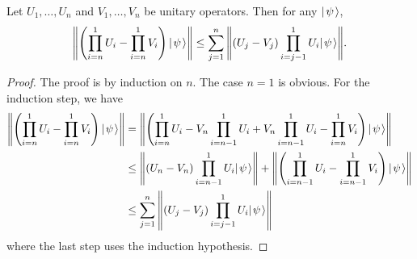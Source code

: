\documentclass[../thesis-main/thesis-main]{subfiles}
\begin{document}
\begin{proposition}
\label{pro:hybrid}Let $U_1,\ldots, U_n$ and $V_1,\ldots, V_n$  be unitary operators.  Then for any $|\mspace{2mu} \psi \mspace{2mu} \rangle$,
\begin{equation}
  \left\|{\left(\prod_{i=n}^1 U_i - \prod_{i=n}^1 V_i \right) |\mspace{2mu} \psi \mspace{2mu} \rangle}\right\|   \le \sum_{j=1}^n \Bigg\|{(U_j - V_j)\prod_{i=j-1}^1 U_i |\mspace{2mu} \psi \mspace{2mu} \rangle}\Bigg\|.
\end{equation}
\end{proposition}

\begin{proof}
The proof is by induction on $n$.  The case $n=1$ is obvious.  For the induction step, we have \begin{align}   \left\|{\left(\prod_{i=n}^1 U_i - \prod_{i=n}^1 V_i \right) |\mspace{2mu} \psi \mspace{2mu} \rangle}\right\|   &= \left\|{\left(\prod_{i=n}^1 U_i - V_n \prod_{i=n-1}^1 U_i             + V_n \prod_{i=n-1}^1 U_i - \prod_{i=n}^1 V_i \right) |\mspace{2mu} \psi \mspace{2mu} \rangle}\right\| \\   &\le \left\|{(U_n - V_n) \prod_{i=n-1}^1 U_i |\mspace{2mu} \psi \mspace{2mu} \rangle}\right\|       +\left\|{\left(\prod_{i=n-1}^1 U_i - \prod_{i=n-1}^1 V_i \right) |\mspace{2mu} \psi \mspace{2mu} \rangle}\right\| \\   &\le \sum_{j=1}^n \left\|{(U_j - V_j)\prod_{i=j-1}^1 U_i |\mspace{2mu} \psi \mspace{2mu} \rangle}\right\| \end{align} where the last step uses the induction hypothesis. 
\end{proof}
\end{document}
